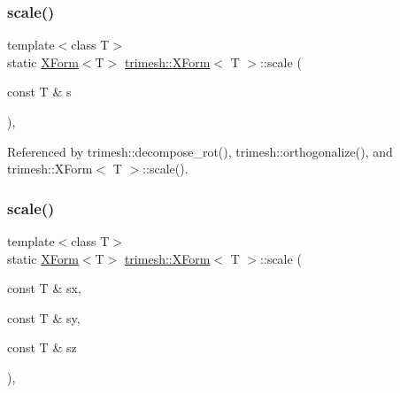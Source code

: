 \mbox{\label{classtrimesh_1_1XForm_aff2e6e97418fad4b72ed1991a1f4db65}} 
\subsubsection{\texorpdfstring{scale()}{scale()}\hspace{0.1cm}{\footnotesize\ttfamily [1/4]}}
{\footnotesize\ttfamily template$<$class T$>$ \\
static \hyperlink{classtrimesh_1_1XForm}{X\+Form}$<$T$>$ \hyperlink{classtrimesh_1_1XForm}{trimesh\+::\+X\+Form}$<$ T $>$\+::scale (\begin{DoxyParamCaption}\item[{const T \&}]{s }\end{DoxyParamCaption})\hspace{0.3cm}{\ttfamily [inline]}, {\ttfamily [static]}}



Referenced by trimesh\+::decompose\+\_\+rot(), trimesh\+::orthogonalize(), and trimesh\+::\+X\+Form$<$ T $>$\+::scale().

\mbox{\label{classtrimesh_1_1XForm_ab620bf599d233b8fed4e14f593fd9274}} 
\subsubsection{\texorpdfstring{scale()}{scale()}\hspace{0.1cm}{\footnotesize\ttfamily [2/4]}}
{\footnotesize\ttfamily template$<$class T$>$ \\
static \hyperlink{classtrimesh_1_1XForm}{X\+Form}$<$T$>$ \hyperlink{classtrimesh_1_1XForm}{trimesh\+::\+X\+Form}$<$ T $>$\+::scale (\begin{DoxyParamCaption}\item[{const T \&}]{sx,  }\item[{const T \&}]{sy,  }\item[{const T \&}]{sz }\end{DoxyParamCaption})\hspace{0.3cm}{\ttfamily [inline]}, {\ttfamily [static]}}

\mbox{\label{classtrimesh_1_1XForm_a0c15b5dac9ec268190ba7b1e62f4ec1a}} 

